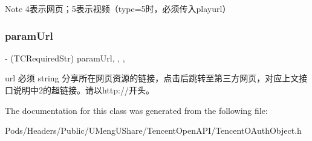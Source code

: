 \begin{DoxyNote}{Note}
4表示网页；5表示视频（type=5时，必须传入playurl） 
\end{DoxyNote}
\mbox{\label{interface_t_c_add_share_dic_ade3c27392e2162022b8037970c324b55}} 
\subsubsection{\texorpdfstring{param\+Url}{paramUrl}}
{\footnotesize\ttfamily -\/ (T\+C\+Required\+Str) param\+Url\hspace{0.3cm}{\ttfamily [read]}, {\ttfamily [write]}, {\ttfamily [nonatomic]}, {\ttfamily [retain]}}

url 必须 string 分享所在网页资源的链接，点击后跳转至第三方网页，对应上文接口说明中2的超链接。请以http\+://开头。 

The documentation for this class was generated from the following file\+:\begin{DoxyCompactItemize}
\item 
Pods/\+Headers/\+Public/\+U\+Meng\+U\+Share/\+Tencent\+Open\+A\+P\+I/Tencent\+O\+Auth\+Object.\+h\end{DoxyCompactItemize}
